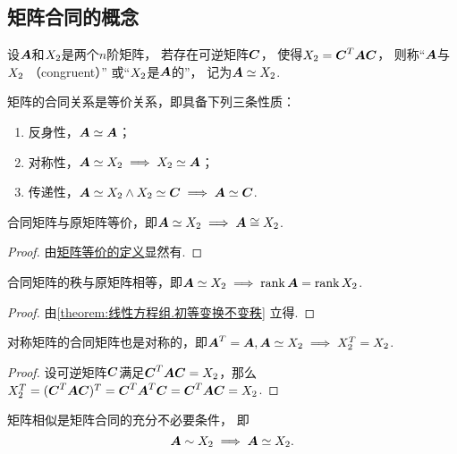 \subsection{矩阵合同的概念}
\begin{definition}
设\(\boldsymbol{A}\)和\(X_2\)是两个\(n\)阶矩阵，
若存在可逆矩阵\(\boldsymbol{C}\)，
使得\(X_2=\boldsymbol{C}^T\boldsymbol{A}\boldsymbol{C}\)，
则称“\(\boldsymbol{A}\)与\(X_2\) （congruent）”%
或“\(X_2\)是\(\boldsymbol{A}\)的”，
记为\(\boldsymbol{A}\simeq X_2\).
\end{definition}

\begin{property}
矩阵的合同关系是等价关系，即具备下列三条性质：
\begin{enumerate}
\item 反身性，\(\boldsymbol{A}\simeq\boldsymbol{A}\)；
\item 对称性，\(\boldsymbol{A}\simeq X_2 \implies X_2\simeq\boldsymbol{A}\)；
\item 传递性，\(\boldsymbol{A}\simeq X_2 \land X_2\simeq\boldsymbol{C} \implies \boldsymbol{A}\simeq\boldsymbol{C}\).
\end{enumerate}
\end{property}

\begin{property}
合同矩阵与原矩阵等价，即\(\boldsymbol{A}\simeq X_2 \implies \boldsymbol{A}\cong X_2\).
\begin{proof}
由\hyperref[definition:逆矩阵.矩阵等价]{矩阵等价的定义}显然有.
\end{proof}
\end{property}

\begin{property}
合同矩阵的秩与原矩阵相等，即\(\boldsymbol{A}\simeq X_2 \implies \rank\boldsymbol{A}=\rank X_2\).
\begin{proof}
由\cref{theorem:线性方程组.初等变换不变秩} 立得.
\end{proof}
\end{property}

\begin{property}
对称矩阵的合同矩阵也是对称的，即\(\boldsymbol{A}^T = \boldsymbol{A}, \boldsymbol{A}\simeq X_2 \implies X_2^T = X_2\).
\begin{proof}
设可逆矩阵\(\boldsymbol{C}\)满足\(\boldsymbol{C}^T\boldsymbol{A}\boldsymbol{C}=X_2\)，那么%
\(X_2^T = (\boldsymbol{C}^T\boldsymbol{A}\boldsymbol{C})^T = \boldsymbol{C}^T\boldsymbol{A}^T\boldsymbol{C} = \boldsymbol{C}^T\boldsymbol{A}\boldsymbol{C} = X_2\).
\end{proof}
\end{property}

\begin{property}
矩阵相似是矩阵合同的充分不必要条件，
即\[
	\boldsymbol{A}\sim X_2
	\implies
	\boldsymbol{A}\simeq X_2.
\]
\end{property}


